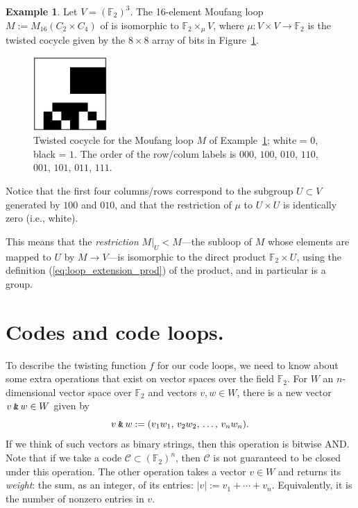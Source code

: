 \documentclass{article}
\theoremstyle{plain}
\theoremstyle{definition}
\newtheorem{example}{Example}
\def \cC {\mathcal{C}}
\def \FF {\mathbb{F}}
\newcommand{\AND}{\mathbin{\textup{\texttt{\&}}}}
\begin{document}
\begin{example}\label{example:m16}
Let $V= (\FF_2)^3$. The 16-element Moufang loop $M := M_{16}(C_2\times C_4)$ of \cite[Theorem 2]{Chein} is isomorphic to $\FF_2 \times_\mu V$,  where  $\mu\colon V\times V\to\FF_2$  is the twisted cocycle given by the $8\times 8$ array of bits in Figure~\ref{fig:cocycle for M}.
\medskip
\begin{figure}[!ht]
\begin{center}
\includegraphics[width=0.25\textwidth]{m16.png}
\end{center}
\caption{Twisted cocycle for the Moufang loop $M$ of Example~\ref{example:m16}; white = $0$, black = $1$. The order of the row/colum labels is $000$, $100$, $010$, $110$, $001$, $101$, $011$, $111$. }\label{fig:cocycle for M}
\end{figure}


Notice that the first four columns/rows correspond to the subgroup $U\subset V$ generated by $100$ and $010$, and that the restriction of $\mu$ to $U\times U$ is identically zero (i.e., white). 

This means that the \emph{restriction} $M\big|_U < M$---the subloop of $M$ whose elements are mapped to $U$ by $M \to V$---is isomorphic to the direct product $\FF_2\times U$, using the definition (\ref{eq:loop_extension_prod}) of the product, and in particular is a group.
\end{example}


\section{Codes and code loops.}

To describe the twisting function $f$ for our code loops, we need to know about some extra operations that exist on vector spaces over the field $\FF_2$. 
For $W$ an $n$-dimensional vector space over $\FF_2$ and vectors $v,w\in W$, there is a new vector $v\AND w \in W$ given by
\[
	v\AND w := (v_1w_1,\,v_2w_2,\,\ldots,\,v_nw_n).
\]
If we think of such vectors as binary strings, then this operation is bitwise AND. 
Note that if we take a code $\cC \subset (\FF_2)^n$, then $\cC$ is not guaranteed to be closed under this operation.
The other operation takes a vector $v\in W$ and returns its \emph{weight}: the sum, as an integer, of its entries: $|v| := v_1 + \cdots + v_n$. 
Equivalently, it is the number of nonzero entries in $v$.
\end{document}
